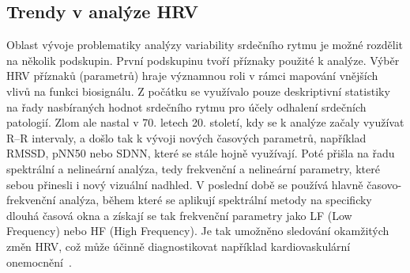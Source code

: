 \subsection{Trendy v analýze HRV}
\label{subsec:hrv_analysis_trends}
Oblast vývoje problematiky analýzy variability srdečního rytmu je možné rozdělit
na několik podskupin. První podskupinu tvoří příznaky použité k analýze. Výběr
\gls{HRV} příznaků (parametrů) hraje významnou roli v rámci mapování vnějších
vlivů na funkci biosignálu. Z počátku se využívalo pouze deskriptivní statistiky
na řady nasbíraných hodnot srdečního rytmu pro účely odhalení srdečních
patologií. Zlom ale nastal v 70. letech 20. století, kdy se k analýze začaly
využívat R--R intervaly, a došlo tak k vývoji nových časových parametrů,
například \gls{RMSSD}, pNN50 nebo SDNN, které se stále hojně využívají. Poté
přišla na řadu spektrální a nelineární analýza, tedy frekvenční a nelineární
parametry, které sebou přinesli i nový vizuální nadhled. V poslední době se
používá hlavně časovo-frekvenční analýza, během které se aplikují spektrální
metody na specificky dlouhá časová okna a získají se tak frekvenční parametry
jako LF (Low Frequency) nebo HF (High Frequency). Je tak umožněno sledování
okamžitých změn \gls{HRV}, což může účinně diagnostikovat například
kardiovaskulární onemocnění~\cite{Shaffer2014,Ishaque2021}.

